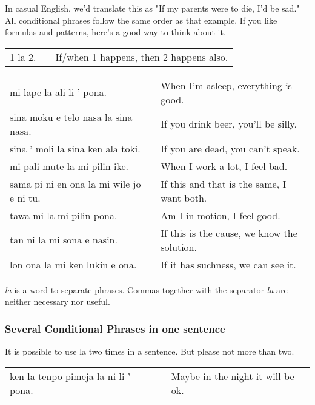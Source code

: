 In casual English, we'd translate this as "If my parents were to die, I'd be sad." 
All conditional phrases follow the same order as that example. 
If you like formulas and patterns, here's a good way to think about it. 

\begin{supertabular}{p{5,5cm}|ll}
1 la 2. && If/when 1 happens, then 2 happens also. \\  %
\end{supertabular} 

\begin{supertabular}{p{5,5cm}|ll}
mi lape la ali li ' pona. && When I'm asleep, everything is good. \\
sina moku e telo nasa la sina nasa. && If you drink beer, you'll be silly. \\
sina ' moli la sina ken ala toki. && If you are dead, you can't speak. \\
mi pali mute la mi pilin ike. && When I work a lot, I feel bad. \\
sama pi ni en ona la mi wile jo e ni tu. &&  If this and that is the same, I want both.\\
tawa mi la mi pilin pona. && Am I in motion, I feel good. \\
tan ni la mi sona e nasin. && If this is the cause, we know the solution. \\
lon ona la mi ken lukin e ona. && If it has suchness, we can see it. \\
\end{supertabular} 

\textit{la} is a word to separate phrases. 
Commas together with the separator \textit{la} are neither necessary nor useful. 

%
\subsubsection*{Several Conditional Phrases in one sentence}
%
It is possible to use la two times in a sentence. But please not more than two. 

\begin{supertabular}{p{5,5cm}|ll}
ken la tenpo pimeja la ni li ' pona. && Maybe in the night it will be ok. \\  
\end{supertabular} 

